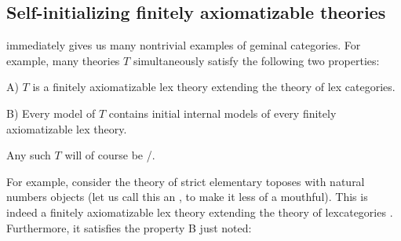\subsection{Self-initializing finitely axiomatizable theories}

 immediately gives us many nontrivial examples of geminal categories. For example, many theories $T$ simultaneously satisfy the following two properties:

A) $T$ is a finitely axiomatizable lex theory extending the theory of lex categories.

B) Every model of $T$ contains initial internal models of every finitely axiomatizable lex theory.

Any such $T$ will of course be \initogeminal/.

For example, consider the theory of strict elementary toposes with natural numbers objects (let us call this an , to make it less of a mouthful). This is indeed a finitely axiomatizable lex theory extending the theory of lexcategories . Furthermore, it satisfies the property B just noted:


